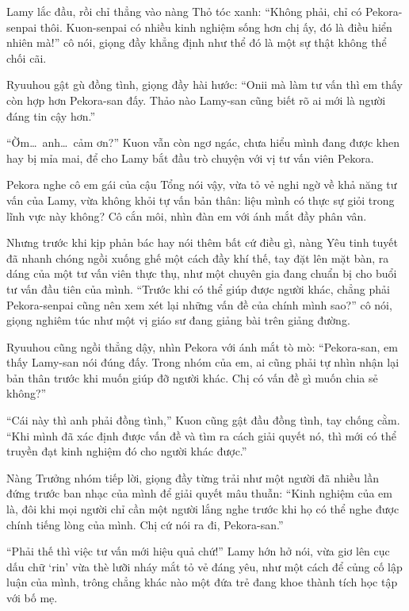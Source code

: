 \documentclass[../main.tex]{subfiles}
\begin{document}
Lamy lắc đầu, rồi chỉ thẳng vào nàng Thỏ tóc xanh: ``Không phải, chỉ có Pekora-senpai thôi. Kuon-senpai có nhiều kinh nghiệm sống hơn chị ấy, đó là điều hiển nhiên mà!'' cô nói, giọng đầy khẳng định như thể đó là một sự thật không thể chối cãi.

Ryuuhou gật gù đồng tình, giọng đầy hài hước: ``Onii mà làm tư vấn thì em thấy còn hợp hơn Pekora-san đấy. Thảo nào Lamy-san cũng biết rõ ai mới là người đáng tin cậy hơn.''

``Ờm\dots\ anh\dots\ cảm ơn?'' Kuon vẫn còn ngơ ngác, chưa hiểu mình đang được khen hay bị mỉa mai, để cho Lamy bắt đầu trò chuyện với vị tư vấn viên Pekora.

Pekora nghe cô em gái của cậu Tổng nói vậy, vừa tỏ vẻ nghi ngờ về khả năng tư vấn của Lamy, vừa không khỏi tự vấn bản thân: liệu mình có thực sự giỏi trong lĩnh vực này không? Cô cắn môi, nhìn đàn em với ánh mắt đầy phân vân.

Nhưng trước khi kịp phản bác hay nói thêm bất cứ điều gì, nàng Yêu tinh tuyết đã nhanh chóng ngồi xuống ghế một cách đầy khí thế, tay đặt lên mặt bàn, ra dáng của một tư vấn viên thực thụ, như một chuyên gia đang chuẩn bị cho buổi tư vấn đầu tiên của mình. ``Trước khi có thể giúp được người khác, chẳng phải Pekora-senpai cũng nên xem xét lại những vấn đề của chính mình sao?'' cô nói, giọng nghiêm túc như một vị giáo sư đang giảng bài trên giảng đường.

Ryuuhou cũng ngồi thẳng dậy, nhìn Pekora với ánh mắt tò mò: ``Pekora-san, em thấy Lamy-san nói đúng đấy. Trong nhóm của em, ai cũng phải tự nhìn nhận lại bản thân trước khi muốn giúp đỡ người khác. Chị có vấn đề gì muốn chia sẻ không?''

``Cái này thì anh phải đồng tình,'' Kuon cũng gật đầu đồng tình, tay chống cằm. ``Khi mình đã xác định được vấn đề và tìm ra cách giải quyết nó, thì mới có thể truyền đạt kinh nghiệm đó cho người khác được.''

Nàng Trưởng nhóm tiếp lời, giọng đầy từng trải như một người đã nhiều lần đứng trước ban nhạc của mình để giải quyết mâu thuẫn: ``Kinh nghiệm của em là, đôi khi mọi người chỉ cần một người lắng nghe trước khi họ có thể nghe được chính tiếng lòng của mình. Chị cứ nói ra đi, Pekora-san.''

``Phải thế thì việc tư vấn mới hiệu quả chứ!'' Lamy hớn hở nói, vừa giơ lên cục dấu chữ `rin' vừa thè lưỡi nháy mắt tỏ vẻ đáng yêu, như một cách để củng cố lập luận của mình, trông chẳng khác nào một đứa trẻ đang khoe thành tích học tập với bố mẹ.
\end{document}
